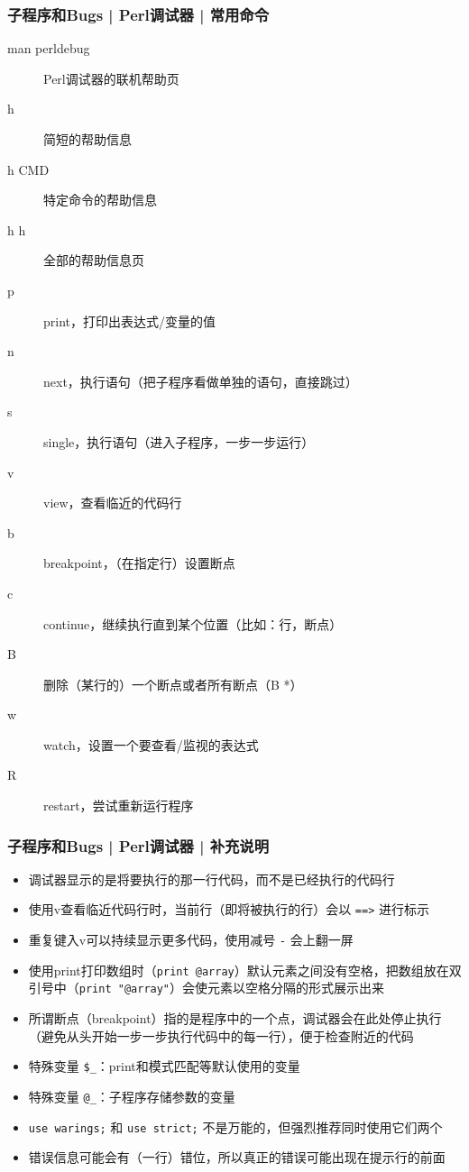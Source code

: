 \begin{frame}
  \frametitle{子程序和Bugs | Perl调试器 | \alert{常用命令}}
  \begin{description}
    \item[man perldebug] Perl调试器的联机帮助页
    \item[h] 简短的帮助信息
    \item[h CMD] 特定命令的帮助信息
    \item[h h] 全部的帮助信息页
    \item[p] print，打印出表达式/变量的值
    \item[n] next，执行语句（把子程序看做单独的语句，直接跳过）
    \item[s] single，执行语句（进入子程序，一步一步运行）
    \item[v] view，查看临近的代码行
    \item[b] breakpoint，（在指定行）设置断点
    \item[c] continue，继续执行直到某个位置（比如：行，断点）
    \item[B] 删除（某行的）一个断点或者所有断点（B *）
    \item[w] watch，设置一个要查看/监视的表达式
    \item[R] restart，尝试重新运行程序
  \end{description}
\end{frame}

\begin{frame}[fragile]
  \frametitle{子程序和Bugs | Perl调试器 | \alert{补充说明}}
  \begin{itemize}
    \item 调试器显示的是将要执行的那一行代码，而不是已经执行的代码行
    \item 使用v查看临近代码行时，当前行（即将被执行的行）会以 \verb|==>| 进行标示
    \item 重复键入v可以持续显示更多代码，使用减号 \verb|-| 会上翻一屏
    \item 使用print打印数组时（\verb|print @array|）默认元素之间没有空格，把数组放在双引号中（\verb|print "@array"|）会使元素以空格分隔的形式展示出来
    \item 所谓断点（breakpoint）指的是程序中的一个点，调试器会在此处停止执行（避免从头开始一步一步执行代码中的每一行），便于检查附近的代码
    \item 特殊变量 \verb|$_|：print和模式匹配等默认使用的变量
    \item 特殊变量 \verb|@_|：子程序存储参数的变量
    \item \verb|use warings;| 和 \verb|use strict;| 不是万能的，但强烈推荐同时使用它们两个
    \item 错误信息可能会有（一行）错位，所以真正的错误可能出现在提示行的前面
  \end{itemize}
\end{frame}

